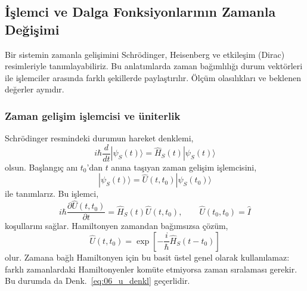\documentclass[00_kitap.tex]{subfiles}
\begin{document}
\subsection{İşlemci ve Dalga Fonksiyonlarının Zamanla Değişimi}
\label{sec:06_zaman}

Bir sistemin zamanla gelişimini Schrödinger, Heisenberg ve
etkileşim (Dirac) resimleriyle tanımlayabiliriz. Bu anlatımlarda
zaman bağımlılığı durum vektörleri ile işlemciler arasında farklı
şekillerde paylaştırılır. Ölçüm olasılıkları ve beklenen değerler
aynıdır.

\subsubsection{Zaman gelişim işlemcisi ve üniterlik}

Schrödinger resmindeki durumun hareket denklemi,
\begin{equation}
 i\hbar\frac{d}{dt}|\psi_S(t)\rangle
 =\hat H_S(t)|\psi_S(t)\rangle
 \label{eq:06_sch_ket}
\end{equation}
olsun. Başlangıç anı $t_0$'dan $t$ anına taşıyan zaman gelişim
işlemcisini,
\begin{equation}
 |\psi_S(t)\rangle=\hat U(t,t_0)|\psi_S(t_0)\rangle
 \label{eq:06_evrim}
\end{equation}
ile tanımlarız. Bu işlemci,
\begin{equation}
 i\hbar\frac{\partial\hat U(t,t_0)}{\partial t}
 =\hat H_S(t)\hat U(t,t_0),\qquad
 \hat U(t_0,t_0)=\hat I
 \label{eq:06_u_denkl}
\end{equation}
koşullarını sağlar. Hamiltonyen zamandan bağımsızsa çözüm,
\begin{equation}
 \boxed{\hat U(t,t_0)=
 \exp\left[-\frac{i}{\hbar}\hat H_S(t-t_0)\right]}
 \label{eq:06_u_ustel}
\end{equation}
olur. Zamana bağlı Hamiltonyen için bu basit üstel genel olarak
kullanılamaz: farklı zamanlardaki Hamiltonyenler komüte etmiyorsa
zaman sıralaması gerekir. Bu durumda da
Denk.~\eqref{eq:06_u_denkl} geçerlidir.
\end{document}
